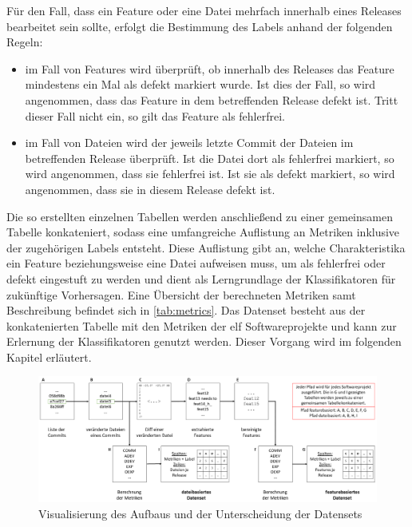 Für den Fall, dass ein Feature oder eine Datei mehrfach innerhalb eines Releases bearbeitet sein sollte, erfolgt die Bestimmung des Labels anhand der folgenden Regeln:

\begin{itemize}
\setlength{\itemsep}{-2pt}
\item im Fall von Features wird überprüft, ob innerhalb des Releases das Feature mindestens ein Mal als \glqq defekt\grqq{} markiert wurde. Ist dies der Fall, so wird angenommen, dass das Feature in dem betreffenden Release defekt ist. Tritt dieser Fall nicht ein, so gilt das Feature als fehlerfrei.
\item im Fall von Dateien wird der jeweils letzte Commit der Dateien im betreffenden Release überprüft. Ist die Datei dort als \glqq fehlerfrei\grqq{} markiert, so wird angenommen, dass sie fehlerfrei ist. Ist sie als \glqq defekt\grqq{} markiert, so wird angenommen, dass sie in diesem Release defekt ist.
\end{itemize}

Die so erstellten einzelnen Tabellen werden anschließend zu einer gemeinsamen Tabelle konkateniert, sodass eine umfangreiche Auflistung an Metriken inklusive der zugehörigen Labels entsteht. Diese Auflistung gibt an, welche Charakteristika ein Feature beziehungsweise eine Datei aufweisen muss, um als \glqq fehlerfrei\grqq{} oder \glqq defekt\grqq{} eingestuft zu werden und dient als Lerngrundlage der Klassifikatoren für zukünftige Vorhersagen. Eine Übersicht der berechneten Metriken samt Beschreibung befindet sich in \autoref{tab:metrics}. Das Datenset besteht aus der konkatenierten Tabelle mit den Metriken der elf Softwareprojekte und kann zur Erlernung der Klassifikatoren genutzt werden. Dieser Vorgang wird im folgenden Kapitel erläutert.

\begin{figure}[t]
    \centering
    \includegraphics[width=\textwidth]{images/Dataset}
    \caption{Visualisierung des Aufbaus und der Unterscheidung der Datensets\label{fig:dataset}}
\end{figure}

